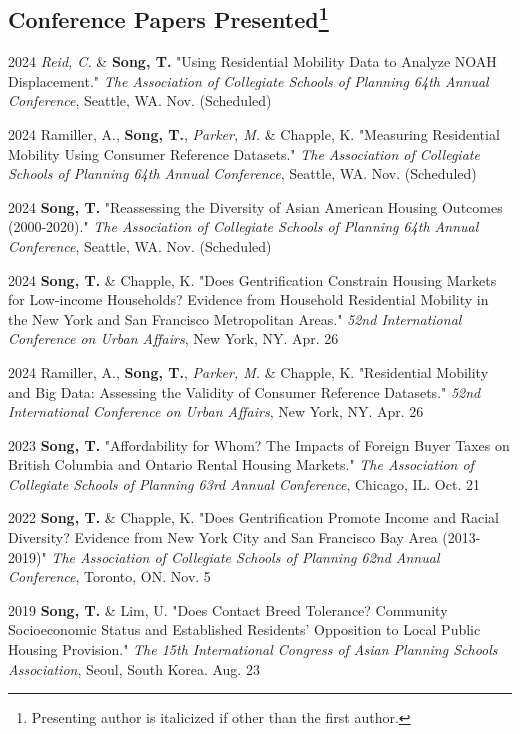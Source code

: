 \documentclass[12pt,letterpaper]{report}
\begin{document}
    \subsection*{Conference Papers Presented\footnote{Presenting author is italicized if other than the first author.}}
    \begin{tablist}
      \item[2024] \tab{}\emph{Reid, C.} \& \textbf{Song, T.} "Using Residential Mobility Data to Analyze NOAH Displacement." \emph{The Association of Collegiate Schools of Planning 64th Annual Conference}, Seattle, WA. Nov. (Scheduled)
      \item[2024] \tab{}Ramiller, A., \textbf{Song, T.}, \emph{Parker, M.} \& Chapple, K. "Measuring Residential Mobility Using Consumer Reference Datasets."  \emph{The Association of Collegiate Schools of Planning 64th Annual Conference}, Seattle, WA. Nov. (Scheduled)
      \item[2024] \tab{}\textbf{Song, T.} "Reassessing the Diversity of Asian American Housing Outcomes (2000-2020)." \emph{The Association of Collegiate Schools of Planning 64th Annual Conference}, Seattle, WA. Nov. (Scheduled)
      \item[2024] \tab{}\textbf{Song, T.} \& Chapple, K. "Does Gentrification Constrain Housing Markets for Low-income Households? Evidence from Household Residential Mobility in the New York and San Francisco Metropolitan Areas." \emph{52nd International Conference on Urban Affairs}, New York, NY. Apr. 26
      \item[2024] \tab{}Ramiller, A., \textbf{Song, T.}, \emph{Parker, M.} \& Chapple, K. "Residential Mobility and Big Data: Assessing the Validity of Consumer Reference Datasets." \emph{52nd International Conference on Urban Affairs}, New York, NY. Apr. 26
      \item[2023] \tab{}\textbf{Song, T.} "Affordability for Whom? The Impacts of Foreign Buyer Taxes on British Columbia and Ontario Rental Housing Markets." \emph{The Association of Collegiate Schools of Planning 63rd Annual Conference}, Chicago, IL. Oct. 21
      \item[2022] \tab{}\textbf{Song, T.} \& Chapple, K. "Does Gentrification Promote Income and Racial Diversity? Evidence from New York City and San Francisco Bay Area (2013-2019)" \emph{The Association of Collegiate Schools of Planning 62nd Annual Conference}, Toronto, ON. Nov. 5
      \item[2019] \tab{}\textbf{Song, T.} \& Lim, U. "Does Contact Breed Tolerance? Community Socioeconomic Status and Established Residents' Opposition to Local Public Housing Provision." \emph{The 15th International Congress of Asian Planning Schools Association}, Seoul, South Korea. Aug. 23

\end{tablist}
\end{document}
